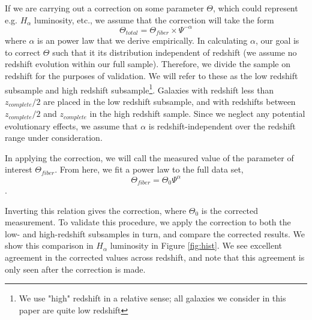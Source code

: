 \documentclass[iop]{emulateapj}
\begin{document}
If we are carrying out a correction on some parameter $\Theta$, which could represent e.g. $H_{\alpha}$ luminosity, etc., we assume that the correction will take the form $$\Theta_{total} = \Theta_{fiber} \times \Psi^{-\alpha}$$ where $\alpha$ is an power law that we derive empirically. In calculating $\alpha$, our goal is to correct $\Theta$ such that it its distribution independent of redshift (we assume no redshift evolution within our full sample). Therefore, we divide the sample on redshift for the purposes of validation. We will refer to these as the low redshift subsample and high redshift subsample\footnote{We use "high" redshift in a relative sense; all galaxies we consider in this paper are quite low redshift}. Galaxies with redshift less than $z_{complete}/2$ are placed in the low redshift subsample, and with redshifts between $z_{complete}/2$ and  $z_{complete}$ in the high redshift sample. Since we neglect any potential evolutionary effects, we assume that $\alpha$ is redshift-independent over the redshift range under consideration. 

In applying the correction, we will call the measured value of the parameter of interest $\Theta_{fiber}$. From here, we fit a power law to the full data set,  $$\Theta_{fiber} = \Theta_0\Psi^{\alpha}$$.

Inverting this relation gives the correction, where $\Theta_0$ is the corrected measurement. To validate this procedure, we apply the correction to both the low- and high-redshift subsamples in turn, and compare the corrected results. We show this comparison in $H_\alpha$ luminosity in Figure \ref{fig:hist}. We see excellent agreement in the corrected values across redshift, and note that this agreement is only seen after the correction is made.
\end{document}
